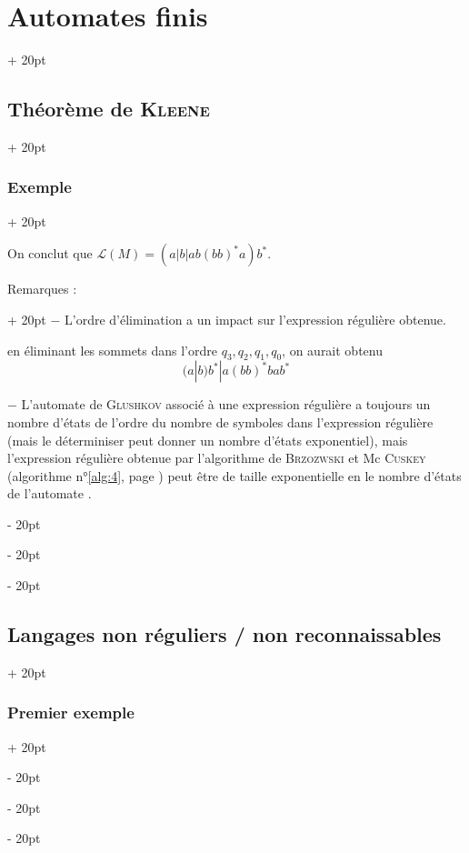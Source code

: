 \documentclass[a4paper, 12pt, twoside]{article}
\newcommand{\ind}[1][20pt]{\advance\leftskip + #1}
\newcommand{\deind}[1][20pt]{\advance\leftskip - #1}
\newenvironment{indt}[2][20pt]{#2 \par \ind[#1]}{\par \deind} %
\begin{document}
\begin{indt}{\section{Automates finis}}
\begin{indt}{\subsection{Théorème de \textsc{Kleene}}}
\begin{indt}{\subsubsection{Exemple}}
\begin{center}
                \end{center}

                \vspace{6pt}
                
                On conclut que $\mathcal L(M) = (a|b|ab(bb)^*a)b^*$.

                \vspace{12pt}
                
                \begin{indt}{Remarques :}
                    $-$ L'ordre d'élimination a un impact sur l'expression régulière obtenue.

                     en éliminant les sommets dans l'ordre $q_3, q_2, q_1, q_0$, on aurait obtenu
                    \[
                        (a|b)b^* | a(bb)^*bab^*
                    \]

                    \vspace{6pt}
                    
                    $-$ L'automate de \textsc{Glushkov} associé à une expression régulière a toujours un nombre d'états de l'ordre du nombre de symboles dans l'expression régulière (mais le déterminiser peut donner un nombre d'états exponentiel), mais l'expression régulière obtenue par l'algorithme de \textsc{Brzozwski} et Mc \textsc{Cuskey} (algorithme n°\ref{alg:4}, page \pageref{alg:4}) peut être de taille exponentielle en le nombre d'états de l'automate .
                \end{indt}
            \end{indt}
        \end{indt}

        \vspace{12pt}
        
        \begin{indt}{\subsection{Langages non réguliers / non reconnaissables}}
            \begin{indt}{\subsubsection{Premier exemple}}
                \label{2.5.1}
                

\end{indt}
\end{indt}
\end{indt}
\end{document}
